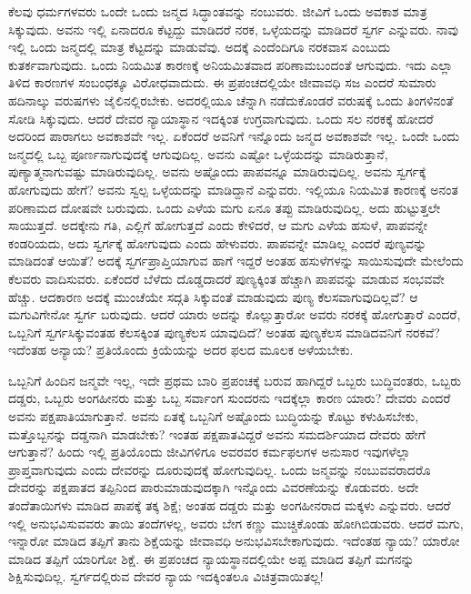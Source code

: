 ಕೆಲವು ಧರ್ಮಗಳವರು ಒಂದೇ ಒಂದು ಜನ್ಮದ ಸಿದ್ಧಾಂತವನ್ನು ನಂಬುವರು. ಜೀವಿಗೆ ಒಂದು ಅವಕಾಶ ಮಾತ್ರ ಸಿಕ್ಕುವುದು. ಅವನು ಇಲ್ಲಿ ಏನಾದರೂ ಕೆಟ್ಟದ್ದು ಮಾಡಿದರೆ ನರಕ, ಒಳ್ಳೆಯದನ್ನು ಮಾಡಿದರೆ ಸ್ವರ್ಗ ಎನ್ನುವರು. ನಾವು ಇಲ್ಲಿ ಒಂದು ಜನ್ಮದಲ್ಲಿ ಮಾತ್ರ ಕೆಟ್ಟದನ್ನು ಮಾಡುವೆವು. ಅದಕ್ಕೆ ಎಂದೆಂದಿಗೂ ನರಕವಾಸ ಎಂಬುದು ಕುತರ್ಕವಾಗುವುದು. ಒಂದು ನಿಯಮಿತ ಕಾರಣಕ್ಕೆ  ಅನಿಯಮಿತವಾದ  ಪರಿಣಾಮ\break ಬಂದಂತೆ ಆಗುವುದು. ಇದು ಎಲ್ಲಾ ತಿಳಿದ ಕಾರಣಗಳ ಸಂಬಂಧಕ್ಕೂ ವಿರೋಧವಾದುದು. ಈ ಪ್ರಪಂಚದಲ್ಲಿಯೇ ಜೀವಾವಧಿ ಸಜ ಎಂದರೆ ಸುಮಾರು ಹದಿನಾಲ್ಕು ವರುಷಗಳು ಜೈಲಿನಲ್ಲಿರಬೇಕು. ಅದರಲ್ಲಿಯೂ ಚೆನ್ನಾಗಿ ನಡೆದುಕೊಂಡರೆ ವರುಷಕ್ಕೆ ಒಂದು ತಿಂಗಳಿನಂತೆ ಸೋಡಿ ಸಿಕ್ಕುವುದು. ಆದರೆ ದೇವರ ನ್ಯಾಯಾಸ್ಥಾನ ಇದಕ್ಕಿಂತ ಉಗ್ರವಾಗುವುದು. ಒಂದು ಸಲ ನರಕಕ್ಕೆ ಹೋದರೆ ಅದರಿಂದ ಪಾರಾಗಲು ಅವಕಾಶವೇ ಇಲ್ಲ. ಏಕೆಂದರೆ ಅವನಿಗೆ ಇನ್ನೊಂದು ಜನ್ಮದ ಅವಕಾಶವೇ ಇಲ್ಲ. ಒಂದೇ ಒಂದು ಜನ್ಮದಲ್ಲಿ ಒಬ್ಬ ಪೂರ್ಣನಾಗುವುದಕ್ಕೆ ಆಗುವುದಿಲ್ಲ. ಅವನು ಎಷ್ಟೋ ಒಳ್ಳೆಯದನ್ನು ಮಾಡಿರುತ್ತಾನೆ, ಪುಣ್ಯಾತ್ಮನಾಗುವಷ್ಟು ಮಾಡಿರುವುದಿಲ್ಲ. ಅವನು ಅಷ್ಟೊಂದು ಪಾಪವನ್ನೂ ಮಾಡಿರುವುದಿಲ್ಲ. ಅವನು ಸ್ವರ್ಗಕ್ಕೆ ಹೋಗುವುದು ಹೇಗೆ? ಅವನು ಸ್ವಲ್ಪ ಒಳ್ಳೆಯದನ್ನು ಮಾಡಿದ್ದಾನೆ ಎನ್ನುವರು. ಇಲ್ಲಿಯೂ ನಿಯಮಿತ ಕಾರಣಕ್ಕೆ ಅನಂತ ಪರಿಣಾಮದ ದೋಷವೇ ಬರುವುದು. ಒಂದು ಎಳೆಯ ಮಗು ಏನೂ ತಪ್ಪು ಮಾಡಿರುವುದಿಲ್ಲ. ಅದು ಹುಟ್ಟುತ್ತಲೇ ಸಾಯುತ್ತದೆ. ಅದಕ್ಕೇನು ಗತಿ, ಎಲ್ಲಿಗೆ ಹೋಗುತ್ತದೆ ಎಂದು ಕೇಳಿದರೆ, ಆ ಮಗು ಎಳೆಯ ಹಸುಳೆ, ಪಾಪವನ್ನೇ ಕಂಡರಿಯದು, ಅದು ಸ್ವರ್ಗಕ್ಕೆ ಹೋಗುವುದು ಎಂದು ಹೇಳುವರು. ಪಾಪವನ್ನೇ ಮಾಡಿಲ್ಲ ಎಂದರೆ ಪುಣ್ಯವನ್ನು ಮಾಡಿದಂತೆ ಆಯಿತೆ? ಅದಕ್ಕೆ ಸ್ವರ್ಗಪ್ರಾಪ್ತಿಯಾಗುವ ಹಾಗೆ ಇದ್ದರೆ ಅಂತಹ ಹಸುಳೆಗಳನ್ನು ಸಾಯಿಸುವುದೇ ಮೇಲೆಂದು ಕೆಲವರು ವಾದಿಸುವರು. ಏಕೆಂದರೆ ಬೆಳೆದು ದೊಡ್ಡದಾದರೆ ಪುಣ್ಯಕ್ಕಿಂತ ಹೆಚ್ಚಾಗಿ ಪಾಪವನ್ನು ಮಾಡುವ ಸಂಭವವೇ ಹೆಚ್ಚು. ಆದಕಾರಣ ಅದಕ್ಕೆ ಮುಂಚೆಯೇ ಸದ್ಗತಿ ಸಿಕ್ಕುವಂತೆ ಮಾಡುವುದು ಪುಣ್ಯ ಕೆಲಸವಾಗುವುದಿಲ್ಲವೆ? ಆ ಮಗುವಿಗೇನೋ ಸ್ವರ್ಗ ಬರುವುದು. ಆದರೆ ಯಾರು ಅದನ್ನು ಕೊಲ್ಲುತ್ತಾರೋ ಅವರು ನರಕಕ್ಕೆ ಹೋಗುತ್ತಾರೆ ಎಂದರೆ, ಒಬ್ಬನಿಗೆ ಸ್ವರ್ಗಸಿಕ್ಕುವಂತಹ ಕೆಲಸಕ್ಕಿಂತ ಪುಣ್ಯಕೆಲಸ ಯಾವುದಿದೆ? ಅಂತಹ ಪುಣ್ಯಕೆಲಸ ಮಾಡಿದವನಿಗೆ ನರಕವೆ? ಇದೆಂತಹ ಅನ್ಯಾಯ? ಪ್ರತಿಯೊಂದು ಕ್ರಿಯೆಯನ್ನು ಅದರ ಫಲದ ಮೂಲಕ ಅಳೆಯಬೇಕು.

\newpage

ಒಬ್ಬನಿಗೆ ಹಿಂದಿನ ಜನ್ಮವೇ ಇಲ್ಲ, ಇದೇ ಪ್ರಥಮ ಬಾರಿ ಪ್ರಪಂಚಕ್ಕೆ ಬರುವ ಹಾಗಿದ್ದರೆ ಒಬ್ಬರು ಬುದ್ಧಿವಂತರು, ಒಬ್ಬರು ದಡ್ಡರು, ಒಬ್ಬರು ಅಂಗಹೀನರು ಮತ್ತು ಒಬ್ಬ ಸರ್ವಾಂಗ ಸುಂದರನು ಇದಕ್ಕೆಲ್ಲಾ ಕಾರಣ ಯಾರು? ದೇವರು ಎಂದರೆ ಅವನು ಪಕ್ಷಪಾತಿಯಾಗುತ್ತಾನೆ. ಅವನು ಏತಕ್ಕೆ ಒಬ್ಬನಿಗೆ ಅಷ್ಟೊಂದು ಬುದ್ಧಿಯನ್ನು ಕೊಟ್ಟು ಕಳುಹಿಸಬೇಕು, ಮತ್ತೊಬ್ಬನನ್ನು ದಡ್ಡನಾಗಿ ಮಾಡಬೇಕು? ಇಂತಹ ಪಕ್ಷಪಾತವಿದ್ದರೆ ಅವನು ಸಮದರ್ಶಿಯಾದ ದೇವರು ಹೇಗೆ ಆಗುತ್ತಾನೆ? ಹಿಂದು ಇಲ್ಲಿ ಪ್ರತಿಯೊಂದು ಜೀವಿಗಳಿಗೂ ಅವರವರ ಕರ್ಮಫಲಗಳ ಅನುಸಾರ ಇವುಗಳೆಲ್ಲಾ ಪ್ರಾಪ್ತವಾಗುವುದು ಎಂದು ದೇವರನ್ನು ದೂರುವುದಕ್ಕೆ ಹೋಗುವುದಿಲ್ಲ. ಒಂದು ಜನ್ಮವನ್ನು ನಂಬುವವರಾದರೊ ದೇವರನ್ನು ಪಕ್ಷಪಾತದ ತಪ್ಪಿನಿಂದ ಪಾರುಮಾಡುವುದಕ್ಕಾಗಿ ಇನ್ನೊಂದು ವಿವರಣೆಯನ್ನು ಕೊಡುವರು. ಅದೇ ತಂದೆತಾಯಿಗಳು ಮಾಡಿದ ಪಾಪಕ್ಕೆ ತಕ್ಕ ಶಿಕ್ಷೆ; ಅಂತಹ ದಡ್ಡರು ಮತ್ತು ಅಂಗಹೀನರಾದ ಮಕ್ಕಳು ಎನ್ನುವರು. ಆದರೆ ಇಲ್ಲಿ ಅನುಭವಿಸುವವರು ತಾಯಿ ತಂದೆಗಳಲ್ಲ, ಅವರು ಬೇಗ ಕಣ್ಣು ಮುಚ್ಚಿಕೊಂಡು ಹೋಗಿಬಿಡುವರು. ಆದರೆ ಮಗು, ಇನ್ನಾರೋ ಮಾಡಿದ ತಪ್ಪಿಗೆ ತಾನು ಶಿಕ್ಷೆಯನ್ನು ಜೀವಾವಧಿ ಅನುಭವಿಸಬೇಕಾಗುವುದು. ಇದೆಂತಹ ನ್ಯಾಯ? ಯಾರೋ ಮಾಡಿದ ತಪ್ಪಿಗೆ ಯಾರಿಗೋ ಶಿಕ್ಷೆ. ಈ ಪ್ರಪಂಚದ ನ್ಯಾಯಸ್ಥಾನದಲ್ಲಿಯೇ ಅಪ್ಪ ಮಾಡಿದ ತಪ್ಪಿಗೆ ಮಗನನ್ನು ಶಿಕ್ಷಿಸುವುದಿಲ್ಲ. ಸ್ವರ್ಗದಲ್ಲಿರುವ ದೇವರ ನ್ಯಾಯ ಇದಕ್ಕಿಂತಲೂ ವಿಚಿತ್ರವಾಯಿತಲ್ಲ!

